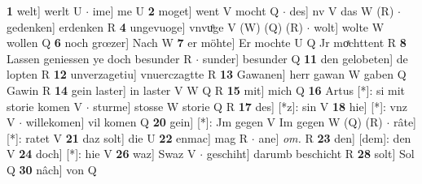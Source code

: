 \documentclass[8pt,a4paper,notitlepage]{article}
\begin{document}
\begin{table}[ht]
\begin{minipage}[t]{0.5\linewidth}
\textbf{1} welt] werlt U  $\cdot$ ime] me U \textbf{2} moget] went V mocht Q  $\cdot$ des] nv V das W (R)  $\cdot$ gedenken] erdenken R \textbf{4} ungevuoge] vnvuͦge V (W) (Q) (R)  $\cdot$ wolt] wolte W wollen Q \textbf{6} noch grœzer] Nach W \textbf{7} er möhte] Er mochte U Q Jr moͯchttent R \textbf{8} Lassen geniessen ye doch besunder R  $\cdot$ sunder] besunder Q \textbf{11} den gelobeten] de lopten R \textbf{12} unverzagetiu] vnuerczagtte R \textbf{13} Gawanen] herr gawan W gaben Q Gawin R \textbf{14} gein laster] in laster V W Q R \textbf{15} mit] mich Q \textbf{16} Artus [*]: si mit storie komen V  $\cdot$ sturme] stosse W storie Q R \textbf{17} des] [*z]: sin V \textbf{18} hie] [*]: vnz V  $\cdot$ willekomen] vil komen Q \textbf{20} gein] [*]: Jm gegen V Im gegen W (Q) (R)  $\cdot$ râte] [*]: ratet V \textbf{21} daz solt] die U \textbf{22} enmac] mag R  $\cdot$ ane] \textit{om.} R \textbf{23} den] [dem]: den V \textbf{24} doch] [*]: hie V \textbf{26} waz] Swaz V  $\cdot$ geschiht] darumb beschicht R \textbf{28} solt] Sol Q \textbf{30} nâch] von Q \newline
\end{minipage}
\end{table}
\end{document}
